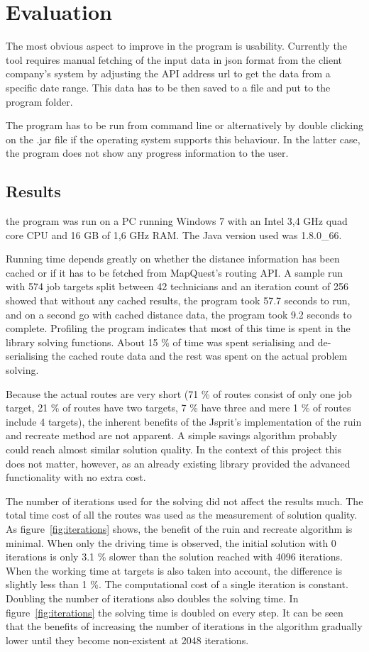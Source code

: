 \chapter{Evaluation}
\label{chapter:evaluation}


The most obvious aspect to improve in the program is usability. Currently the tool requires manual fetching of the input data in json format from the client company's system by adjusting the API address url to get the data from a specific date range. This data has to be then saved to a file and put to the program folder. 

The program has to be run from command line or alternatively by double clicking on the .jar file if the operating system supports this behaviour. In the latter case, the program does not show any progress information to the user.

\section{Results}
the program was run on a PC running Windows 7 with an Intel 3,4 GHz quad core CPU and 16 GB of 1,6 GHz RAM. The Java version used was 1.8.0\_66. 

Running time depends greatly on whether the distance information has been cached or if it has to be fetched from MapQuest's routing API. A sample run with 574 job targets split between 42 technicians and an iteration count of 256 showed that without any cached results, the program took 57.7 seconds to run, and on a second go with cached distance data, the program took 9.2 seconds to complete. Profiling the program indicates that most of this time is spent in the library solving functions. About 15 \% of time was spent serialising and de-serialising the cached route data and the rest was spent on the actual problem solving.

Because the actual routes are very short (71 \% of routes consist of only one job target, 21 \% of routes have two targets, 7 \% have three and mere 1 \% of routes include 4 targets), the inherent benefits of the Jsprit's implementation of the ruin and recreate method are not apparent. A simple savings algorithm probably could reach almost similar solution quality. In the context of this project this does not matter, however, as an already existing library provided the advanced functionality with no extra cost. 


The number of iterations used for the solving did not affect the results much. The total time cost of all the routes was used as the measurement of solution quality. As figure~\ref{fig:iterations} shows, the benefit of the ruin and recreate algorithm is minimal. When only the driving time is observed, the initial solution with 0 iterations is only 3.1 \% slower than the solution reached with 4096 iterations. When the working time at targets is also taken into account, the difference is slightly less than 1 \%. The computational cost of a single iteration is constant. Doubling the number of iterations also doubles the solving time. In figure~\ref{fig:iterations} the solving time is doubled on every step. It can be seen that the benefits of increasing the number of iterations in the algorithm gradually lower until they become non-existent at 2048 iterations. 

